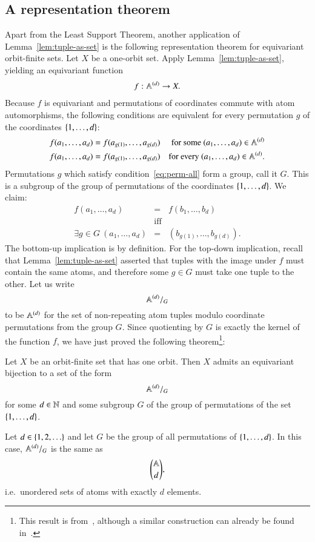 \subsection*{A representation theorem} Apart from the Least Support Theorem, another application of Lemma~\ref{lem:tuple-as-set} is the following representation theorem for equivariant orbit-finite sets.
Let $X$ be a one-orbit set. Apply Lemma~\ref{lem:tuple-as-set}, yielding an equivariant function
 \begin{align*}
 f : \mathbb A^{(d)} \to X.
 \end{align*}
 Because $f$ is equivariant and permutations of coordinates commute with atom automorphisms, the following conditions are equivalent for every permutation $g$ of the coordinates $\{1,\ldots,d\}$:
 \begin{eqnarray}
 \label{eq:perm-some} f(a_1,\ldots,a_d) = f(a_{g(1)},\ldots,a_{g(d)}) & & \text{for some $(a_1,\ldots,a_d) \in \mathbb A^{(d)}$}\\
 \label{eq:perm-all} f(a_1,\ldots,a_d) = f(a_{g(1)},\ldots,a_{g(d)}) & & \text{for every $(a_1,\ldots,a_d) \in \mathbb A^{(d)}$}.
 \end{eqnarray}
 Permutations $g$ which satisfy condition~\eqref{eq:perm-all} form a group, call it $G$. This is a subgroup of the group of permutations of the coordinates $\{1,\ldots,d\}$.  We claim:
 \begin{eqnarray*}
 f(a_1,\ldots,a_d) &=& f(b_1,\ldots,b_d)\\ & \text{iff} & \\ \exists g \in G\ (a_1,\ldots,a_d)&=& (b_{g(1)},\ldots,b_{g(d)}).
 \end{eqnarray*}
 The bottom-up implication is by definition. For the top-down implication, recall that Lemma~\ref{lem:tuple-as-set} asserted that tuples with the image under $f$ must contain the same atoms, and therefore some $g \in G$ must take one tuple to the other. 
 Let us write
$$\mathbb A^{(d)} /_G$$ to be $\mathbb A^{(d)}$
for the set of non-repeating atom tuples modulo coordinate permutations from the group $G$. Since quotienting by $G$ is exactly the kernel of the function $f$, we have just proved the following theorem\footnote{This result is from~\cite[Theorem 10.17]{DBLP:journals/corr/BojanczykKL14}, although a similar construction can already be found in~\cite[Definition 2]{DBLP:conf/fossacs/FerrariMP02}. 
}:
\begin{theorem}\label{thm:classify-one-orbit} Let $X$ be an orbit-finite set that has one orbit. 
Then $X$  admits an equivariant bijection to a set of the form $$\mathbb A^{(d)} /_G$$ for some $d \in {\mathbb N}$ and some subgroup $G$ of the group of permutations of the set $\{1,\ldots,d\}$.
\end{theorem}
\begin{myexample}
 Let $d \in \{1,2,\ldots\}$ and let $G$ be the group of all permutations of $\{1,\ldots,d\}$. In this case, $\mathbb A^{(d)} /_G$ is the same as 
 \begin{align*}
 {\mathbb A\choose d},
 \end{align*}
 i.e.~unordered sets of atoms with exactly $d$ elements. 
\end{myexample}




